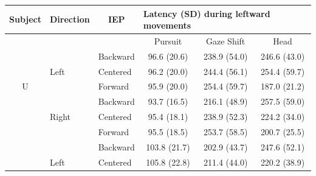 \documentclass[12pt]{article}
\begin{document}
\begin{table}[h]
\begin{tabular}{@{}lllccc@{}}
\toprule
Subject               & Direction                    & \multicolumn{1}{c}{IEP}          & \multicolumn{3}{l}{Latency (SD) during leftward movements}                                                         \\ \midrule
                      &                              &                                  & Pursuit                              & Gaze Shift                           & Head                                 \\
                      & \cellcolor[HTML]{EFEFEF}     & \cellcolor[HTML]{EFEFEF}Backward & \cellcolor[HTML]{EFEFEF}96.6 (20.6)  & \cellcolor[HTML]{EFEFEF}238.9 (54.0) & \cellcolor[HTML]{EFEFEF}246.6 (43.0) \\
                      & \cellcolor[HTML]{EFEFEF}Left & \cellcolor[HTML]{EFEFEF}Centered & \cellcolor[HTML]{EFEFEF}96.2 (20.0)  & \cellcolor[HTML]{EFEFEF}244.4 (56.1) & \cellcolor[HTML]{EFEFEF}254.4 (59.7) \\
\multicolumn{1}{c}{U} & \cellcolor[HTML]{EFEFEF}     & \cellcolor[HTML]{EFEFEF}Forward  & \cellcolor[HTML]{EFEFEF}95.9 (20.0)  & \cellcolor[HTML]{EFEFEF}254.4 (59.7) & \cellcolor[HTML]{EFEFEF}187.0 (21.2) \\
                      &                              & Backward                         & 93.7 (16.5)                          & 216.1 (48.9)                         & 257.5 (59.0)                         \\
                      & Right                        & Centered                         & 95.4 (18.1)                          & 238.9 (52.3)                         & 224.2 (34.0)                         \\
                      &                              & Forward                          & 95.5 (18.5)                          & 253.7 (58.5)                         & 200.7 (25.5)                         \\
                      & \cellcolor[HTML]{EFEFEF}     & \cellcolor[HTML]{EFEFEF}Backward & \cellcolor[HTML]{EFEFEF}103.8 (21.7) & \cellcolor[HTML]{EFEFEF}202.9 (43.7) & \cellcolor[HTML]{EFEFEF}247.6 (52.1) \\
                      & \cellcolor[HTML]{EFEFEF}Left & \cellcolor[HTML]{EFEFEF}Centered & \cellcolor[HTML]{EFEFEF}105.8 (22.8) & \cellcolor[HTML]{EFEFEF}211.4 (44.0) & \cellcolor[HTML]{EFEFEF}220.2 (38.9) \\

\end{tabular}
\end{table}
\end{document}
